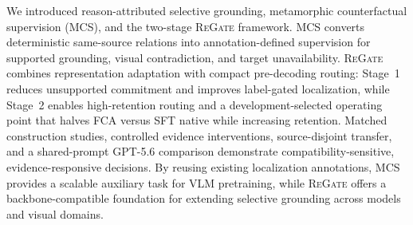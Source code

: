 \documentclass[letterpaper]{article}
\newcommand{\Method}{\textsc{ReGate}\xspace}
\begin{document}
We introduced reason-attributed selective grounding, metamorphic counterfactual supervision (MCS), and the two-stage \Method framework. MCS converts deterministic same-source relations into annotation-defined supervision for supported grounding, visual contradiction, and target unavailability. \Method combines representation adaptation with compact pre-decoding routing: Stage~1 reduces unsupported commitment and improves label-gated localization, while Stage~2 enables high-retention routing and a development-selected operating point that halves FCA versus SFT native while increasing retention. Matched construction studies, controlled evidence interventions, source-disjoint transfer, and a shared-prompt GPT-5.6 comparison demonstrate compatibility-sensitive, evidence-responsive decisions. By reusing existing localization annotations, MCS provides a scalable auxiliary task for VLM pretraining, while \Method offers a backbone-compatible foundation for extending selective grounding across models and visual domains.

{\small}
\end{document}
